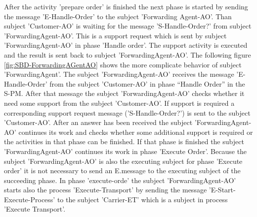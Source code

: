 After the activity 'prepare order' is finished the next phase is started by sending the message 'E-Handle-Order' to the subject 'Forwarding Agent-AO'. Than subject 'Customer-AO' is waiting for the message 'S-Handle-Order?' from subject 'ForwardingAgent-AO'. This is a support request which is sent by subject 'ForwardingAgent-AO' in phase 'Handle order'. The support activity is executed and the result is sent back to subject 'ForwardingAgent-AO'.
The following figure \ref{fig:SBD-ForwardingAGentAO} shows the more complicate behavior of subject 'ForwardingAgent'. 
The subject 'ForwardingAgent-AO' receives the message 'E-Handle-Order' from the subject 'Customer-AO' in phase “Handle Order” in the S-PM. After that message the subject 'ForwardingAgent-AO'  checks whether it need some support from the subject 'Customer-AO'. If support is required a corresponding support request message ('S-Handle-Order?') is sent to the subject 'Customer-AO'. After an answer has been received the subject 'ForwardingAgent-AO' continues its work and checks whether some additional support is required or the activities in that phase can be finished. If that phase is finished the subject 'ForwardingAgent-AO' continues its work in phase 'Execute Order'. Because the subject 'ForwardingAgent-AO' is also the executing subject for phase 'Execute order' it is not necessary to send an E.message to the executing subject of the succeeding phase. In phase 'execute-orde' the subject 'ForwardingAgent-AO' starts also the process 'Execute-Transport' by sending the message 'E-Start-Execute-Process' to the subject 'Carrier-ET' which is a subject in process 'Execute Transport'.


